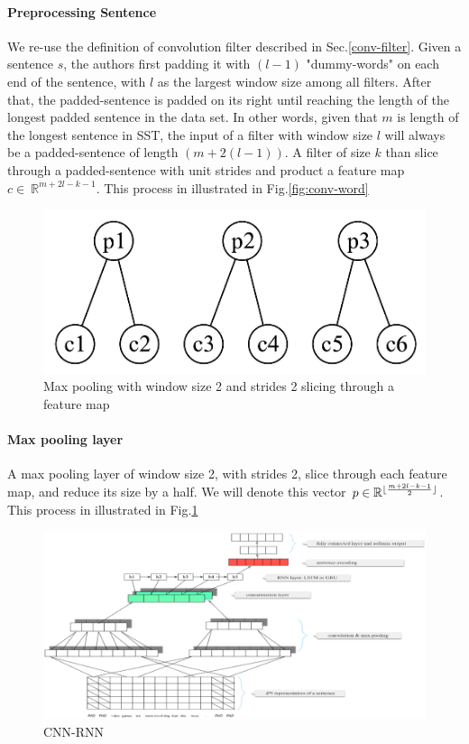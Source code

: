 \paragraph{Preprocessing Sentence} We re-use the definition of convolution filter described in Sec.\ref{conv-filter}.
Given a sentence \(s\), the authors first padding it with \((l-1)\) "dummy-words" on each end of the sentence, with \(l\) as the largest window size among all filters.
After that, the padded-sentence is padded on its right until reaching the length of the longest padded sentence in the data set.
In other words, given that \(m\) is length of the longest sentence in SST, the input of a filter with window size \(l\) will always be a padded-sentence of length \((m + 2(l-1))\).
A filter of size \(k\) than slice through a padded-sentence with unit strides and product a feature map \(c \in \ \mathbb{R}^{m + 2l - k - 1}\).
This process in illustrated in Fig.\ref{fig:conv-word}

\begin{figure}[H]
    \centering    \includegraphics[scale=0.34]{figure/2-max}
    \caption{Max pooling with window size 2 and strides 2 slicing through a feature map}
    \label{fig:2-max-pooling}
\end{figure}
  
\paragraph{Max pooling layer} A max pooling layer of window size 2, with strides 2, slice through each feature map, and reduce its size by a half.
We will denote this vector \(p \in \mathbb{R}^{\lfloor \frac{m + 2l - k - 1}{2} \rfloor} \). 
This process in illustrated in Fig.\ref{fig:2-max-pooling}   


\begin{figure}[H]
    \raggedleft    \includegraphics[scale=0.425]{figure/cnn-rnn}
    \caption{CNN-RNN}
    \label{fig:cnn-rnn}
\end{figure}

